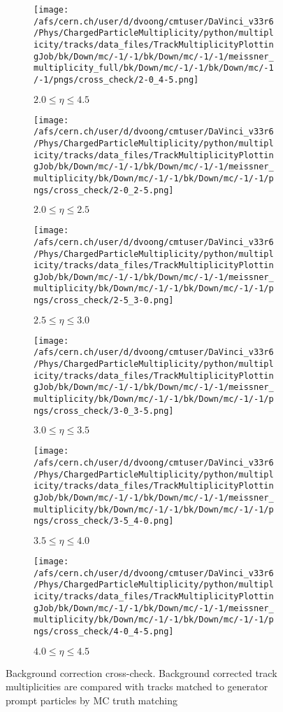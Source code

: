 \begin{figure}[h]
	\centering
	\begin{subfigure}{0.32\textwidth}
		\texttt{[image: /afs/cern.ch/user/d/dvoong/cmtuser/DaVinci\_v33r6/Phys/ChargedParticleMultiplicity/python/multiplicity/tracks/data\_files/TrackMultiplicityPlottingJob/bk/Down/mc/-1/-1/bk/Down/mc/-1/-1/meissner\_multiplicity\_full/bk/Down/mc/-1/-1/bk/Down/mc/-1/-1/pngs/cross\_check/2-0\_4-5.png]}
		\caption{$2.0 \le \eta \le 4.5$}
	\end{subfigure}
	\begin{subfigure}{0.32\textwidth}
		\texttt{[image: /afs/cern.ch/user/d/dvoong/cmtuser/DaVinci\_v33r6/Phys/ChargedParticleMultiplicity/python/multiplicity/tracks/data\_files/TrackMultiplicityPlottingJob/bk/Down/mc/-1/-1/bk/Down/mc/-1/-1/meissner\_multiplicity/bk/Down/mc/-1/-1/bk/Down/mc/-1/-1/pngs/cross\_check/2-0\_2-5.png]}
		\caption{$2.0 \le \eta \le 2.5$}
	\end{subfigure}
	\begin{subfigure}{0.32\textwidth}
		\texttt{[image: /afs/cern.ch/user/d/dvoong/cmtuser/DaVinci\_v33r6/Phys/ChargedParticleMultiplicity/python/multiplicity/tracks/data\_files/TrackMultiplicityPlottingJob/bk/Down/mc/-1/-1/bk/Down/mc/-1/-1/meissner\_multiplicity/bk/Down/mc/-1/-1/bk/Down/mc/-1/-1/pngs/cross\_check/2-5\_3-0.png]}
		\caption{$2.5 \le \eta \le 3.0$}
	\end{subfigure}
	\begin{subfigure}{0.32\textwidth}
		\texttt{[image: /afs/cern.ch/user/d/dvoong/cmtuser/DaVinci\_v33r6/Phys/ChargedParticleMultiplicity/python/multiplicity/tracks/data\_files/TrackMultiplicityPlottingJob/bk/Down/mc/-1/-1/bk/Down/mc/-1/-1/meissner\_multiplicity/bk/Down/mc/-1/-1/bk/Down/mc/-1/-1/pngs/cross\_check/3-0\_3-5.png]}
		\caption{$3.0 \le \eta \le 3.5$}
	\end{subfigure}
	\begin{subfigure}{0.32\textwidth}
		\texttt{[image: /afs/cern.ch/user/d/dvoong/cmtuser/DaVinci\_v33r6/Phys/ChargedParticleMultiplicity/python/multiplicity/tracks/data\_files/TrackMultiplicityPlottingJob/bk/Down/mc/-1/-1/bk/Down/mc/-1/-1/meissner\_multiplicity/bk/Down/mc/-1/-1/bk/Down/mc/-1/-1/pngs/cross\_check/3-5\_4-0.png]}
		\caption{$3.5 \le \eta \le 4.0$}
	\end{subfigure}
	\begin{subfigure}{0.32\textwidth}
		\texttt{[image: /afs/cern.ch/user/d/dvoong/cmtuser/DaVinci\_v33r6/Phys/ChargedParticleMultiplicity/python/multiplicity/tracks/data\_files/TrackMultiplicityPlottingJob/bk/Down/mc/-1/-1/bk/Down/mc/-1/-1/meissner\_multiplicity/bk/Down/mc/-1/-1/bk/Down/mc/-1/-1/pngs/cross\_check/4-0\_4-5.png]}
		\caption{$4.0 \le \eta \le 4.5$}
	\end{subfigure}
	\caption{Background correction cross-check. Background corrected track multiplicities are compared with tracks matched to generator prompt particles by MC truth matching}
	\label{fig: background corrected track multiplicity cross-check}
\end{figure}